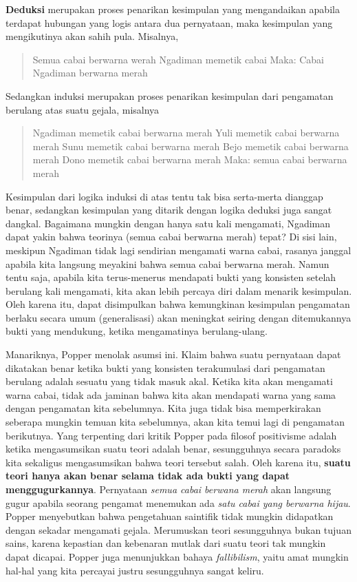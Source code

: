 \documentclass[
  english,
  man]{apa6}
\begin{document}
\textbf{Deduksi} merupakan proses penarikan kesimpulan yang mengandaikan apabila terdapat hubungan yang logis antara dua pernyataan, maka kesimpulan yang mengikutinya akan sahih pula. Misalnya,

\begin{quote}
Semua cabai berwarna werah
Ngadiman memetik cabai
Maka: Cabai Ngadiman berwarna merah
\end{quote}

Sedangkan induksi merupakan proses penarikan kesimpulan dari pengamatan berulang atas suatu gejala, misalnya

\begin{quote}
Ngadiman memetik cabai berwarna merah
Yuli memetik cabai berwarna merah
Sunu memetik cabai berwarna merah
Bejo memetik cabai berwarna merah
Dono memetik cabai berwarna merah
Maka: semua cabai berwarna merah
\end{quote}

Kesimpulan dari logika induksi di atas tentu tak bisa serta-merta dianggap benar, sedangkan kesimpulan yang ditarik dengan logika deduksi juga sangat dangkal. Bagaimana mungkin dengan hanya satu kali mengamati, Ngadiman dapat yakin bahwa teorinya (semua cabai berwarna merah) tepat? Di sisi lain, meskipun Ngadiman tidak lagi sendirian mengamati warna cabai, rasanya janggal apabila kita langsung meyakini bahwa semua cabai berwarna merah. Namun tentu saja, apabila kita terus-menerus mendapati bukti yang konsisten setelah berulang kali mengamati, kita akan lebih percaya diri dalam menarik kesimpulan. Oleh karena itu, dapat disimpulkan bahwa kemungkinan kesimpulan pengamatan berlaku secara umum (generalisasi) akan meningkat seiring dengan ditemukannya bukti yang mendukung, ketika mengamatinya berulang-ulang.

Manariknya, Popper menolak asumsi ini. Klaim bahwa suatu pernyataan dapat dikatakan benar ketika bukti yang konsisten terakumulasi dari pengamatan berulang adalah sesuatu yang tidak masuk akal. Ketika kita akan mengamati warna cabai, tidak ada jaminan bahwa kita akan mendapati warna yang sama dengan pengamatan kita sebelumnya. Kita juga tidak bisa memperkirakan seberapa mungkin temuan kita sebelumnya, akan kita temui lagi di pengamatan berikutnya. Yang terpenting dari kritik Popper pada filosof positivisme adalah ketika mengasumsikan suatu teori adalah benar, sesungguhnya secara paradoks kita sekaligus mengasumsikan bahwa teori tersebut salah. Oleh karena itu, \textbf{suatu teori hanya akan benar selama tidak ada bukti yang dapat menggugurkannya}. Pernyataan \emph{semua cabai berwana merah} akan langsung gugur apabila seorang pengamat menemukan ada \emph{satu cabai yang berwarna hijau}. Popper menyebutkan bahwa pengetahuan saintifik tidak mungkin didapatkan dengan sekadar mengamati gejala. Merumuskan teori sesungguhnya bukan tujuan sains, karena kepastian dan kebenaran mutlak dari suatu teori tak mungkin dapat dicapai. Popper juga menunjukkan bahaya \emph{fallibilism}, yaitu amat mungkin hal-hal yang kita percayai justru sesungguhnya sangat keliru.
\end{document}
